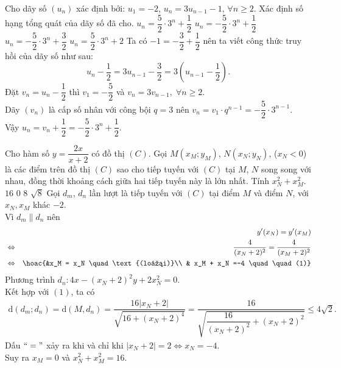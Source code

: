 \begin{ex}%
	Cho dãy số $(u_n)$ xác định bởi: $u_1=-2$, $u_n=3u_{n-1}-1, \, \forall n \geq 2$. Xác định số hạng tổng quát của dãy số đã cho.
	\choice
	{$u_n=\dfrac{5}{2} \cdot 3^n + \dfrac{1}{2} $}
	{\True $u_n=-\dfrac{5}{2} \cdot 3^n + \dfrac{1}{2}$}
	{$u_n=-\dfrac{5}{2} \cdot 3^n + \dfrac{3}{2}$}
	{$u_n=\dfrac{5}{2} \cdot 3^n + 2 $}
	\loigiai
	{
		Ta có $-1=-\dfrac{3}{2}+\dfrac{1}{2}$ nên ta viết công thức truy hồi của dãy số như sau:
		$$u_n - \dfrac{1}{2}=3u_{n-1}-\dfrac{3}{2}=3\left( u_{n-1} - \dfrac{1}{2} \right). $$		
		Đặt $v_n = u_n - \dfrac{1}{2}$ thì $ v_1 = -\dfrac{5}{2}$ và $v_n = 3 v_{n-1},\; \forall n \ge 2$.\\
		Dãy $(v_n )$ là cấp số nhân với công bội $q=3$ nên  $v_n = v_1 \cdot q^{n-1}= - \dfrac{5}{2} \cdot 3^{n-1}$.\\
		Vậy $u_n = v_n+\dfrac{1}{2} = -\dfrac{5}{2} \cdot 3^n +\dfrac{1}{2}$.
	}
\end{ex}

\begin{ex}%
	Cho hàm số $y=\dfrac{2x}{x+2}$ có đồ thị  $(C)$. Gọi $M(x_M; y_M)$, $N(x_N; y_N)$, ($x_N < 0$) là các điểm trên đồ thị $(C)$ sao cho tiếp tuyến với $(C)$ tại $M$, $N$ song song với nhau, đồng thời khoảng cách giữa hai tiếp tuyến này là lớn nhất. Tính $x_N^2+x_M^2$.
	\choice
	{\True $16$}
	{$0$}
	{$8$}
	{$\sqrt{8}$}
	\loigiai
	{
		Gọi $d_m$, $d_n$ lần lượt là tiếp tuyến với $(C)$ tại điểm $M$ và điểm $N$, với $x_N, x_M$ khác $-2$.\\
		Vì $d_m \parallel d_n$ nên
		\begin{eqnarray*}
			&&y'(x_N)=y'(x_M) \\
			&\Leftrightarrow & \dfrac{4}{(x_N+2)^2}=\dfrac{4}{(x_M+2)^2} \\
			&\Leftrightarrow & \hoac{&x_M = x_N \quad \text{(loại)}\\ & x_M + x_N =-4 \quad \quad (1)}
		\end{eqnarray*}
		Phương trình $d_n: 4x-(x_N+2)^2 y +2x_N^2 = 0$.\\
		Kết hợp với $(1)$, ta có 
		\begin{eqnarray*}
			\mathrm{d} \left(d_m;d_n \right) = \mathrm{d} \left( M,d_n \right)=\dfrac{16 \left| x_N + 2 \right|}{\sqrt{16+(x_N+2)^4}} =\dfrac{16}{\sqrt{\dfrac{16}{(x_N+2)^2}+(x_N+2)^2}} \le 4\sqrt{2}.
		\end{eqnarray*}
		Dấu $``="$ xảy ra khi và chỉ khi $\left| x_N+2 \right| = 2 \Leftrightarrow x_N = -4$.\\
		Suy ra $x_M=0$ và $x_N^2+x_M^2 = 16$.
	}
\end{ex}

